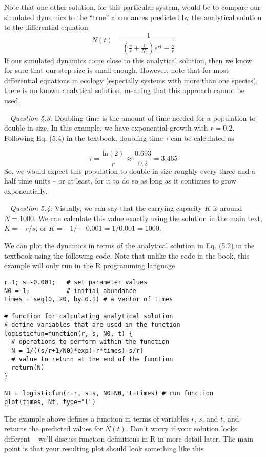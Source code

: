 \documentclass[12pt]{article}
\begin{document}
Note that one other solution, for this particular system, would be to compare our simulated dynamics to the ``true'' abundances predicted by the analytical solution to the differential equation
$$N(t) = \frac{1}{\left( \frac{s}{r}+\frac{1}{N_0} \right) e^{rt}-\frac{s}{r}}$$
If our simulated dynamics come close to this analytical solution, then we know for sure that our step-size is small enough. However, note that for most differential equations in ecology (especially systems with more than one species), there is no known analytical solution, meaning that this approach cannot be used.

~\newline
\textit{Question 5.3:}
\newline
Doubling time is the amount of time needed for a population to double in size. In this example, we have exponential growth with $r = 0.2$. Following Eq. (5.4) in the textbook, doubling time $\tau$ can be calculated as

$$\tau = \frac{\mathrm{ln}(2)}{r} \approx \frac{0.693}{0.2} = 3.465 $$
So, we would expect this population to double in size roughly every three and a half time units -- or at least, for it to do so as long as it continues to grow exponentially.

~\newline
\textit{Question 5.4:}
\newline
Visually, we can say that the carrying capacity $K$ is around $N = 1000$. We can calculate this value exactly using the solution in the main text, $K = -r/s$, or $K = -1/-0.001 = 1/0.001 = 1000$.

We can plot the dynamics in terms of the analytical solution in Eq. (5.2) in the textbook using the following code. Note that unlike the code in the book, this example will only run in the R programming language

\begin{verbatim}
r=1; s=-0.001;   # set parameter values
N0 = 1;          # initial abundance
times = seq(0, 20, by=0.1) # a vector of times

# function for calculating analytical solution
# define variables that are used in the function
logisticfun=function(r, s, N0, t) {
  # operations to perform within the function 
  N = 1/((s/r+1/N0)*exp(-r*times)-s/r)
  # value to return at the end of the function
  return(N)                                
}

Nt = logisticfun(r=r, s=s, N0=N0, t=times) # run function
plot(times, Nt, type="l")
\end{verbatim}
The example above defines a function in terms of variables $r$, $s$, and $t$, and returns the predicted values for $N(t)$. Don't worry if your solution looks different -- we'll discuss function definitions in R in more detail later. The main point is that your resulting plot should look something like this
\end{document}
